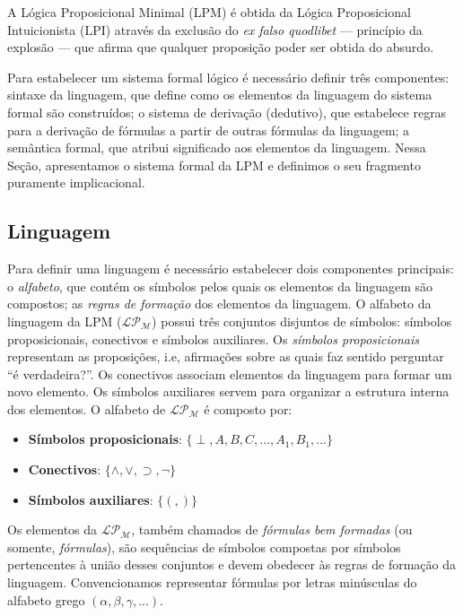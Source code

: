 A Lógica Proposicional Minimal (LPM) é obtida da Lógica Proposicional Intuicionista (LPI) através da exclusão do \textit{ex falso quodlibet} --- princípio da explosão --- que afirma que qualquer proposição poder ser obtida do absurdo.

Para estabelecer um sistema formal lógico é necessário definir três componentes: sintaxe da linguagem, que define como os elementos da linguagem do sistema formal são construídos; o sistema de derivação (dedutivo), que estabelece regras para a derivação de fórmulas a partir de outras fórmulas da linguagem; a semântica formal, que atribui significado aos elementos da linguagem. Nessa Seção, apresentamos o sistema formal da LPM e definimos o seu fragmento puramente implicacional.

\subsection{Linguagem}

Para definir uma linguagem é necessário estabelecer dois componentes principais: o \textit{alfabeto}, que contém os símbolos pelos quais os elementos da linguagem são compostos; as \textit{regras de formação} dos elementos da linguagem. O alfabeto da linguagem da LPM ($\mathcal{LP_{M}}$) possui três conjuntos disjuntos de símbolos: símbolos proposicionais, conectivos e símbolos auxiliares. Os \textit{símbolos proposicionais} representam as proposições, i.e, afirmações sobre as quais faz sentido perguntar ``é verdadeira?''. Os conectivos associam elementos da linguagem para formar um novo elemento. Os símbolos auxiliares servem para organizar a estrutura interna dos elementos. O alfabeto de $\mathcal{LP_M}$ é composto por:

\begin{itemize}
    \item \textbf{Símbolos proposicionais}: $\{\perp, A, B, C, ..., A_1, B_1, ...\}$
    \item \textbf{Conectivos}: $\{\land, \lor, \supset, \neg\}$
    \item \textbf{Símbolos auxiliares}: $\{(,)\}$
\end{itemize}
 
Os elementos da $\mathcal{LP_M}$, também chamados de \textit{fórmulas bem formadas} (ou somente, \textit{fórmulas}), são sequências de símbolos compostas por símbolos pertencentes à união desses conjuntos e devem obedecer às regras de formação da linguagem. Convencionamos representar fórmulas por letras minúsculas do alfabeto grego $(\alpha, \beta, \gamma, ...)$.

